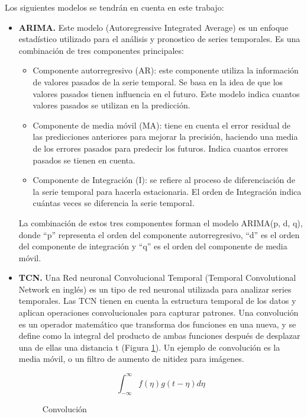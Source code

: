 Los siguientes modelos se tendrán en cuenta en este trabajo:
\begin{itemize}
    \item \textbf{ARIMA.} Este modelo (Autoregressive Integrated Average) \cite{hyndman2018forecasting} es un enfoque estadístico utilizado para 
        el análisis y pronostico de series temporales. Es una combinación de tres componentes principales:
        \begin{itemize}
            \item Componente autorregresivo (AR): este componente utiliza la información de valores pasados de la
                serie temporal. Se basa en la idea de que los valores pasados tienen influencia en el futuro. Este 
                modelo indica cuantos valores pasados se utilizan en la predicción.
            \item Componente de media móvil (MA): tiene en cuenta el error residual de las predicciones anteriores 
                para mejorar la precisión, haciendo una media de los errores pasados para predecir los futuros. 
                Indica cuantos errores pasados se tienen en cuenta.
            \item Componente de Integración (I): se refiere al proceso de diferenciación de la serie temporal para 
                hacerla estacionaria. El orden de Integración indica cuántas veces se diferencia la serie temporal.
        \end{itemize}
        La combinación de estos tres componentes forman el modelo ARIMA(p, d, q), donde ``p'' representa el orden 
        del componente autorregresivo, ``d'' es el orden del componente de integración y ``q'' es el orden del componente 
        de media móvil.
    \item \textbf{TCN.} Una Red neuronal Convolucional Temporal (Temporal Convolutional Network en inglés) \cite{DBLP:journals/corr/abs-1803-01271} es un tipo de 
        red neuronal utilizada para analizar series temporales. Las TCN tienen en cuenta la estructura temporal de los datos 
        y aplican operaciones convolucionales para capturar patrones. Una convolución \cite{hirschman2012convolution} es un operador matemático que transforma 
        dos funciones en una nueva, y se define como la integral del producto de ambas funciones después de desplazar una de ellas 
        una distancia t (Figura \ref{conv}). Un ejemplo de convolución es la media móvil, o un filtro de aumento de nitidez para imágenes.

        \begin{figure}[h]
            \[\int_{-\infty}^{\infty}f(\eta)g(t - \eta)d\eta\]
            \caption{Convolución}
            \label{conv}
        \end{figure}


\end{itemize}
